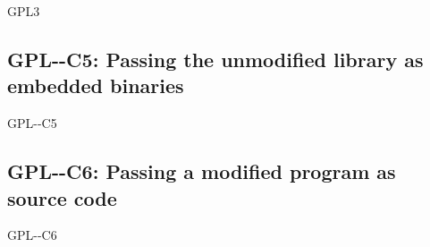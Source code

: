 \begin{license}{GPL3}
\subsection{GPL-\ver-C5: Passing the unmodified library as embedded binaries} 
\begin{lsuc}{GPL-\ver-C5}

  \useCaseFive{\ver}
  \coversFive

  \begin{lsucrequires}
    \lsucmandatory{\keepLicenseElements}
    \lsucmandatory{\gplthreeEnsureCopyrightNoticeBinary}
    \lsucmandatory{\giveLicense}\passingFilesCorrectly
    \lsucmandatory{\makeAllSourcesAvailable}
    \lsucmandatory{\describeHowToGetSource}
    \lsucmandatory{\addToCopyrightDialogLib}
    \lsucmandatory{\arrangeEnclosingBinaries}
    \lsucmandatory{\retainCopyrightNotices}
    \lsucoptional{\addToDocumentation}
  \end{lsucrequires}

  \begin{lsucprohibits}
    \lsucitem{\noPatentLitigation}
  \end{lsucprohibits}
\end{lsuc}

\subsection{GPL-\ver-C6: Passing a modified program as source code}
\begin{lsuc}{GPL-\ver-C6}

  \useCaseSix{\ver}
  \coversSix

  \begin{lsucrequires}
    \lsucmandatory{\keepLicenseElements}
    \lsucmandatory{\gplthreeEnsureCopyrightNoticeSource}
    \lsucmandatory{\giveLicense}\passingFilesCorrectly
    \lsucmandatory{\retainCopyrightNotices}
    \lsucmandatory{\addToCopyrightDialogApp}
    \lsucmandatory{\markProgramModifications}
    \lsucmandatory{\arrangeProgramChanges}\howToApplyTheseTerms
    \lsucoptional{\createChangelog}
    \lsucoptional{\addToDocumentation}
  \end{lsucrequires}

  \begin{lsucprohibits}
    \lsucitem{\noPatentLitigation}
  \end{lsucprohibits}
\end{lsuc}


\end{license}
